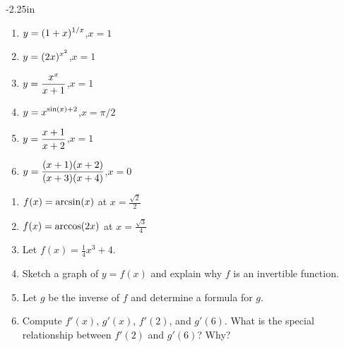 \begin{adjustwidth*}{}{-2.25in}
\begin{multicols*}{2}

\begin{enumerate}[1),resume]
\item $\displaystyle y=(1+x)^{1/x}$,\quad $x=1$
\item $\displaystyle y=(2x)^{x^2}$,\quad $x=1$
\item $\displaystyle y=\frac{x^{x}}{x+1}$,\quad $x=1$
\item $\displaystyle y=x^{\sin (x)+2}$,\quad $x=\pi/2$
\item $\displaystyle y=\frac{x+1}{x+2}$,\quad $x=1$
\item $\displaystyle y=\frac{(x+1)(x+2)}{(x+3)(x+4)}$,\quad $x=0$
\end{enumerate}


\begin{enumerate}[1),resume]
\item $\displaystyle f(x) = \arcsin(x)$ at $x = \frac{\sqrt{2}}{2}$
\item $\displaystyle f(x) = \arccos(2x)$ at $x = \frac{\sqrt{3}}{4}$

\item Let $f(x) = \frac{1}{4}x^3 + 4.$
\ba
	\item Sketch a graph of $y = f(x)$ and explain why $f$ is an invertible function.
	\item Let $g$ be the inverse of $f$ and determine a formula for $g$.
	\item Compute $f'(x)$, $g'(x)$, $f'(2)$, and $g'(6)$.  What is the special relationship between $f'(2)$ and $g'(6)$?  Why?
\ea

\end{enumerate}

\end{multicols*}
\end{adjustwidth*}

\clearpage

